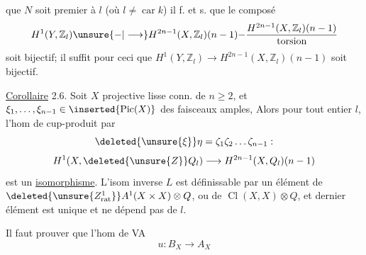 que  $N$ soit premier à $l$ (où $l\ne\operatorname{car}k$) il f. et s. que le composé
\[
H^1(Y,\mathbb Z_l)\unsure{\mathord{-}|\longrightarrow} H^{2n-1}(X,\mathbb Z_l)(n-1)\mathord{-}
\frac{H^{2n-1}(X,\mathbb Z_l)(n-1)}{\text{torsion}}
\]
soit  bijectif;  il suffit pour ceci que $H^1(Y,\mathbb Z_l)\to H^{2n-1}(X,\mathbb Z_l)(n-1)$ soit bijectif.

\uline{Corollaire} 2.6. Soit $X$ projective lisse conn. de  $n\geq2$, et $\xi_1,\ldots,\xi_{n-1}\in\inserted{\operatorname{Pic}(X)}$   des faisceaux amples,  Alors pour tout entier $l$, l'hom de cup-produit par
\[
\deleted{\unsure{\xi}}\eta=\zeta_1\zeta_2\ldots\zeta_{n-1}:
\]
\[
H^1(X,\deleted{\unsure{Z}}Q_l)\longrightarrow H^{2n-1}(X,Q_l)(n-1)
\]
est un \uline{isomorphisme}. L'isom inverse $L$ est définissable par un élément de $\deleted{\unsure{Z^1_{\mathrm{rat}}}}A^1(X\times X)\otimes Q$,  ou  de $\operatorname{Cl}(X,X)\otimes Q$, et   dernier élément est unique et ne dépend pas de $l$.

Il faut prouver que l'hom de VA
\[
u:B_X\longrightarrow A_X
\]

